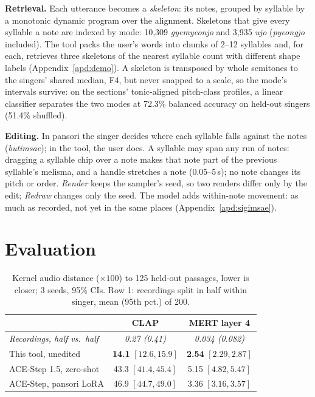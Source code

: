 \documentclass[wcp]{jmlr}
\begin{document}
\textbf{Retrieval.} Each utterance becomes a \emph{skeleton}: its notes, grouped by
syllable by a monotonic dynamic program over the alignment. Skeletons that give every
syllable a note are indexed by mode: 10,309 \emph{gyemyeonjo} and 3,935 \emph{ujo}
(\emph{pyeongjo} included). The tool packs the user's words into chunks of 2--12 syllables
and, for each, retrieves three skeletons of the nearest syllable count with different
shape labels (Appendix~\ref{apd:demo}). A skeleton is transposed by whole semitones
to the singers' shared median, F4, but never snapped to a scale, so the mode's intervals
survive: on the sections' tonic-aligned pitch-class profiles, a linear
classifier separates the two modes at 72.3\% balanced accuracy on held-out singers
(51.4\% shuffled).

\textbf{Editing.} In pansori the singer decides where each syllable falls against the notes
(\emph{butimsae}); in the tool, the user does. A syllable may span any run of
notes: dragging a syllable chip over a note makes that note part of the previous
syllable's melisma, and a handle stretches a note (0.05--5\,s); no note changes its pitch
or order. \emph{Render} keeps the sampler's seed, so two renders differ only by the edit;
\emph{Redraw} changes only the seed. The model adds within-note movement: as much as
recorded, not yet in the same places
(Appendix~\ref{apd:sigimsae}).

\section{Evaluation}\label{sec:kad}
\begin{table}[t]
\centering
\small
\caption{Kernel audio distance ($\times 100$) to 125 held-out passages, lower is closer;
3 seeds, 95\% CIs. Row 1: recordings split in half within singer, mean (95th pct.) of 200.}
\label{tab:kad}
\begin{tabular}{lcc}
\toprule
 & CLAP & MERT layer 4 \\
\midrule
\emph{Recordings, half vs.\ half} & \emph{0.27 (0.41)} & \emph{0.034 (0.082)} \\
\midrule
This tool, unedited & \textbf{14.1} $[12.6, 15.9]$ & \textbf{2.54} $[2.29, 2.87]$ \\
ACE-Step 1.5, zero-shot & 43.3 $[41.4, 45.4]$ & 5.15 $[4.82, 5.47]$ \\
ACE-Step, pansori LoRA & 46.9 $[44.7, 49.0]$ & 3.36 $[3.16, 3.57]$ \\
\bottomrule
\end{tabular}
\end{table}
\end{document}
